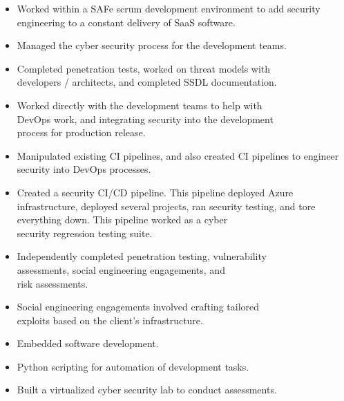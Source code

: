 \documentclass[10pt,a4paper,ragged2e]{rohrbach}
\begin{document}
\begin{paracol}{2}
\pagebreak

\begin{itemize}
  \item Worked within a SAFe scrum development environment to add security engineering to a constant delivery of SaaS software.
  \item Managed the cyber security process for the development teams.
  \item Completed penetration tests, worked on threat models with\\ developers / architects, and completed SSDL documentation. 
  \item Worked directly with the development teams to help with\\ DevOps work, and integrating security into the development\\ process for production release.
  \item Manipulated existing CI pipelines, and also created CI pipelines to engineer security into DevOps processes.
  \item Created a security CI/CD pipeline. This pipeline deployed Azure infrastructure, deployed several projects, ran security testing, and tore everything down. This pipeline worked as a cyber\\ security regression testing suite.
\end{itemize}

\divider

\begin{itemize}
  \item Independently completed penetration testing, vulnerability \\ assessments, social engineering engagements, and\\ risk assessments. 
  \item Social engineering engagements involved crafting tailored\\ exploits based on the client’s infrastructure.
\end{itemize}

\divider

\begin{itemize}
  \item Embedded software development.
  \item Python scripting for automation of development tasks.
  \item Built a virtualized cyber security lab to conduct assessments. 
\end{itemize}


\end{paracol}
\end{document}
